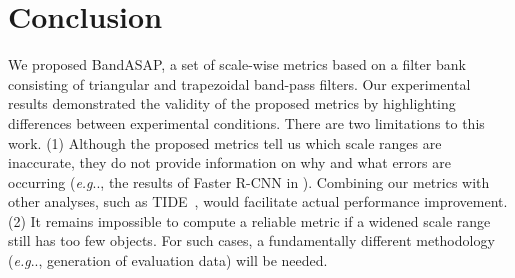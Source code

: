 \documentclass{mva_style}
\makeatletter
\DeclareRobustCommand\onedot{\futurelet\@let@token\@onedot}
\def\@onedot{\ifx\@let@token.\else.\null\fi\xspace}
\def\eg{\emph{e.g}\onedot} \def\Eg{\emph{E.g}\onedot}
\makeatother
\begin{document}
\section{Conclusion}
\label{sec:conclusion}

We proposed BandASAP, a set of scale-wise metrics based on a filter bank consisting of triangular and trapezoidal band-pass filters.
Our experimental results demonstrated the validity of the proposed metrics by highlighting differences between experimental conditions.
There are two limitations to this work.
(1) Although the proposed metrics tell us which scale ranges are inaccurate, they do not provide information on why and what errors are occurring (\eg, the results of Faster R-CNN in ).
Combining our metrics with other analyses, such as TIDE~\cite{TIDE_ECCV2020}, would facilitate actual performance improvement.
(2)
It remains impossible to compute a reliable metric if a widened scale range still has too few objects.
For such cases, a fundamentally different methodology (\eg, generation of evaluation data) will be needed.





\end{document}
